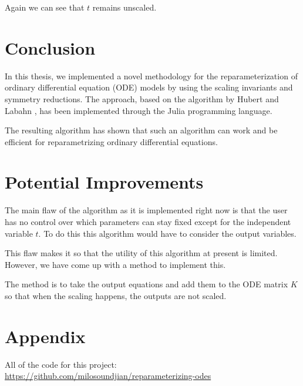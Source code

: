 \documentclass[oneside, a4paper, onecolumn, 11pt]{article}
\begin{document}
Again we can see that \(t\) remains unscaled.

\section{Conclusion}

In this thesis, we implemented a novel methodology for the reparameterization of ordinary differential equation (ODE) models by using the scaling invariants and symmetry reductions. The approach, based on the algorithm by Hubert and Labahn \cite{Hubert2013}, has been implemented through the Julia programming language.

The resulting algorithm has shown that such an algorithm can work and be efficient for reparametrizing ordinary differential equations.

\section{Potential Improvements}

The main flaw of the algorithm as it is implemented right now is that the user has no control over which parameters can stay fixed except for the independent variable \(t\). To do this this algorithm would have to consider the output variables.

This flaw makes it so that the utility of this algorithm at present is limited. However, we have come up with a method to implement this.

The method is to take the output equations and add them to the ODE matrix \(K\) so that when the scaling happens, the outputs are not scaled.

\newpage



\newpage
\appendix

\section{Appendix}

All of the code for this project: \url{https://github.com/milosoundjian/reparameterizing-odes}

\label{sec:appendix}
\end{document}
